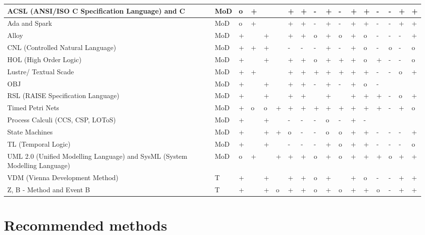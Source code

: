 \documentclass{./template/openetcs2}
\begin{document}
{\begin{center}
\begin{landscape}
\begin{longtable}{|m{6cm}|m{0.8cm}|m{0.3cm}|m{0.3cm}|m{0.7cm}|m{0.3cm}|m{0.3cm}|m{0.7cm}|m{0.3cm}|m{0.3cm}|m{0.3cm}|m{0.3cm}|m{0.3cm}|m{0.7cm}|m{0.7cm}|m{0.7cm}|m{0.3cm}|}
ACSL (ANSI/ISO C Specification Language) and C&MoD&o&+&&&+&+&-&+&-&+&+&-&-&+&+ \\ \hline
Ada and Spark&MoD&o&+&&&+&+&-&+&-&+&+&-&-&+&+ \\ \hline
Alloy&MoD&+&&+&&+&+&o&+&o&+&o&-&-&-&+ \\ \hline
CNL (Controlled Natural Language)&MoD&+&+&+&&-&-&-&+&-&+&o&-&o&-&o \\ \hline
HOL (High Order Logic)&MoD&+&&+&&+&+&o&+&+&+&o&+&-&-&o \\ \hline
Lustre/ Textual Scade&MoD&+&+&&&+&+&+&+&+&+&+&-&-&o&+ \\ \hline
OBJ&MoD&+&&+&&+&+&-&+&-&+&o&-&&& \\ \hline
RSL (RAISE Specification Language)&MoD&+& &+& &+&+& &+& &+&+&+&-&o&+\\ \hline
Timed Petri Nets&MoD&+&o&o&+&+&+&+&+&+&+&+&+&-&+&o\\ \hline
Process Calculi (CCS, CSP, LOToS)&MoD&+&&+&&-&-&-&o&-&+&-&&&& \\ \hline
State Machines&MoD&+&&+&+&o&-&-&o&o&+&+&-&-&-&+ \\ \hline
TL (Temporal Logic)&MoD&+&&+&&-&-&-&+&o&+&+&-&-&-&o \\ \hline
UML 2.0 (Unified Modelling Language) and SysML (System Modelling Language)&MoD&o&+&&+&+&+&o&+&o&+&+&+&o&+&+ \\ \hline
VDM (Vienna Development Method)&T&+&&+&&+&+&o&+&&+&o&-&-&+&+ \\ \hline
Z, B - Method and Event B&T&+&&+&o&+&+&o&+&o&+&+&o&-&+&+ \\ \hline


\end{longtable}

   \end{landscape}
\end{center}

\begin{tabbing}





\end{tabbing}

\chapter{Recommended methods}
\label{chap: method}



}
\end{document}

